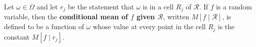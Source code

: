 Let $\omega \in \Omega$ and let $r_j$ be the statement that $\omega$ is in a cell $R_j$ of $\mathcal{R}$. If $f$ is a random variable, then the \textbf{conditional mean of $f$ given $\mathcal{R}$}, written $M[f \mid \mathcal{R}]$, is defined to be a function of $\omega$ whose value at every point in the cell $R_j$ is the constant $M[f \mid r_j]$.